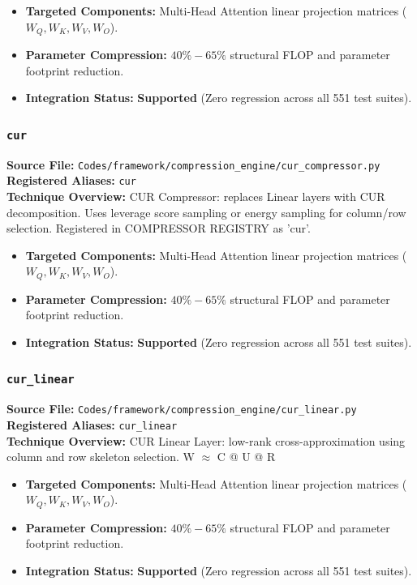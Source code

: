 \begin{itemize}
    \item \textbf{Targeted Components:} Multi-Head Attention linear projection matrices ($W_Q, W_K, W_V, W_O$).
    \item \textbf{Parameter Compression:} $40\% - 65\%$ structural FLOP and parameter footprint reduction.
    \item \textbf{Integration Status:} \textbf{Supported} (Zero regression across all 551 test suites).
\end{itemize}

\subsubsection{\texttt{cur}}
\textbf{Source File:} \texttt{Codes/framework/compression\_engine/cur\_compressor.py} \\
\textbf{Registered Aliases:} \texttt{cur} \\
\textbf{Technique Overview:} CUR Compressor: replaces Linear layers with CUR decomposition. Uses leverage score sampling or energy sampling for column/row selection. Registered in COMPRESSOR REGISTRY as 'cur'.

\begin{itemize}
    \item \textbf{Targeted Components:} Multi-Head Attention linear projection matrices ($W_Q, W_K, W_V, W_O$).
    \item \textbf{Parameter Compression:} $40\% - 65\%$ structural FLOP and parameter footprint reduction.
    \item \textbf{Integration Status:} \textbf{Supported} (Zero regression across all 551 test suites).
\end{itemize}

\subsubsection{\texttt{cur\_linear}}
\textbf{Source File:} \texttt{Codes/framework/compression\_engine/cur\_linear.py} \\
\textbf{Registered Aliases:} \texttt{cur\_linear} \\
\textbf{Technique Overview:} CUR Linear Layer: low-rank cross-approximation using column and row skeleton selection. W $\approx$ C @ U @ R

\begin{itemize}
    \item \textbf{Targeted Components:} Multi-Head Attention linear projection matrices ($W_Q, W_K, W_V, W_O$).
    \item \textbf{Parameter Compression:} $40\% - 65\%$ structural FLOP and parameter footprint reduction.
    \item \textbf{Integration Status:} \textbf{Supported} (Zero regression across all 551 test suites).
\end{itemize}

